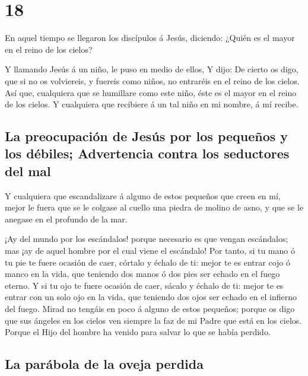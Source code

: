 \hypertarget{section-17}{%
\section{18}\label{section-17}}

 En aquel tiempo se llegaron los discípulos á Jesús,
diciendo: ¿Quién es el mayor en el reino de los cielos?

 Y llamando Jesús á un niño, le puso en medio de ellos,
 Y dijo: De cierto os digo, que si no os volviereis, y
fuereis como niños, no entraréis en el reino de los cielos. 
Así que, cualquiera que se humillare como este niño, éste es el mayor en
el reino de los cielos.  Y cualquiera que recibiere á un tal
niño en mi nombre, á mí recibe.

\hypertarget{la-preocupaciuxf3n-de-jesuxfas-por-los-pequeuxf1os-y-los-duxe9biles-advertencia-contra-los-seductores-del-mal}{%
\subsection{La preocupación de Jesús por los pequeños y los débiles;
Advertencia contra los seductores del
mal}\label{la-preocupaciuxf3n-de-jesuxfas-por-los-pequeuxf1os-y-los-duxe9biles-advertencia-contra-los-seductores-del-mal}}

 Y cualquiera que escandalizare á alguno de estos pequeños
que creen en mí, mejor le fuera que se le colgase al cuello una piedra
de molino de asno, y que se le anegase en el profundo de la mar.

 ¡Ay del mundo por los escándalos! porque necesario es que
vengan escándalos; mas ¡ay de aquel hombre por el cual viene el
escándalo!  Por tanto, si tu mano ó tu pie te fuere ocasión
de caer, córtalo y échalo de ti: mejor te es entrar cojo ó manco en la
vida, que teniendo dos manos ó dos pies ser echado en el fuego eterno.
 Y si tu ojo te fuere ocasión de caer, sácalo y échalo de
ti: mejor te es entrar con un solo ojo en la vida, que teniendo dos ojos
ser echado en el infierno del fuego.  Mirad no tengáis en
poco á alguno de estos pequeños; porque os digo que sus ángeles en los
cielos ven siempre la faz de mi Padre que está en los cielos.
 Porque el Hijo del hombre ha venido para salvar lo que se
había perdido.

\hypertarget{la-paruxe1bola-de-la-oveja-perdida}{%
\subsection{La parábola de la oveja
perdida}\label{la-paruxe1bola-de-la-oveja-perdida}}

